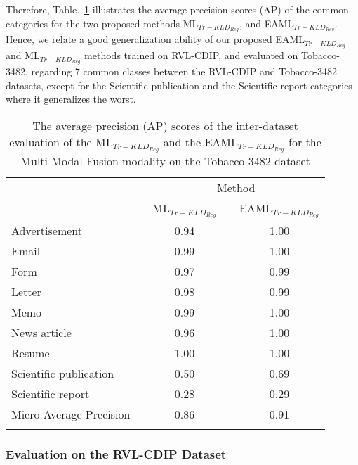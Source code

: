 \documentclass[twocolumn]{svjour3}
\begin{document}
Therefore, Table.~\ref{tab:AP scores} illustrates the average-precision scores (AP) of the common categories for the two proposed methods ML$_{{Tr-KLD}_{Reg}}$, and EAML$_{{Tr-KLD}_{Reg}}$. Hence, we relate a good generalization ability of our proposed EAML$_{{Tr-KLD}_{Reg}}$ and ML$_{{Tr-KLD}_{Reg}}$ methods trained on RVL-CDIP, and evaluated on Tobacco-3482, regarding 7 common classes between the RVL-CDIP and Tobacco-3482 datasets, except for the Scientific publication and the Scientific report categories where it generalizes the worst. 
\setlength\tabcolsep{0.6 pt}
\begin{table}[tbh]
\small
\centering
\caption{The average precision (AP) scores of the inter-dataset evaluation of the ML$_{{Tr-KLD}_{Reg}}$ and the EAML$_{{Tr-KLD}_{Reg}}$ for the Multi-Modal Fusion modality on the Tobacco-3482 dataset}
    \begin{tabular}{lcccc}
    \hline\noalign{\smallskip}
    \multicolumn{1}{c}{} && \multicolumn{3}{c}{Method} \\
         \noalign{\smallskip}\hline\noalign{\smallskip}
     \multicolumn{1}{c}{Class Labels} && \multicolumn{1}{c}{ML$_{{Tr-KLD}_{Reg}}$} && \multicolumn{1}{c}{EAML$_{{Tr-KLD}_{Reg}}$} \\
         \noalign{\smallskip}\hline\noalign{\smallskip}
         Advertisement && 0.94 && 1.00\\
         Email && 0.99 && 1.00\\
         Form && 0.97 && 0.99\\
         Letter && 0.98 && 0.99\\
         Memo && 0.99 && 1.00\\
         News article && 0.96 && 1.00\\
         Resume && 1.00 && 1.00\\
         Scientific publication && 0.50 && 0.69\\
         Scientific report && 0.28 && 0.29\\
    \noalign{\smallskip}\hline\noalign{\smallskip}
        Micro-Average Precision && 0.86 && 0.91 \\
    \noalign{\smallskip}\hline
    
    \end{tabular}\label{tab:AP scores}
    
\end{table}
\subsubsection{Evaluation on the RVL-CDIP Dataset}
\end{document}
